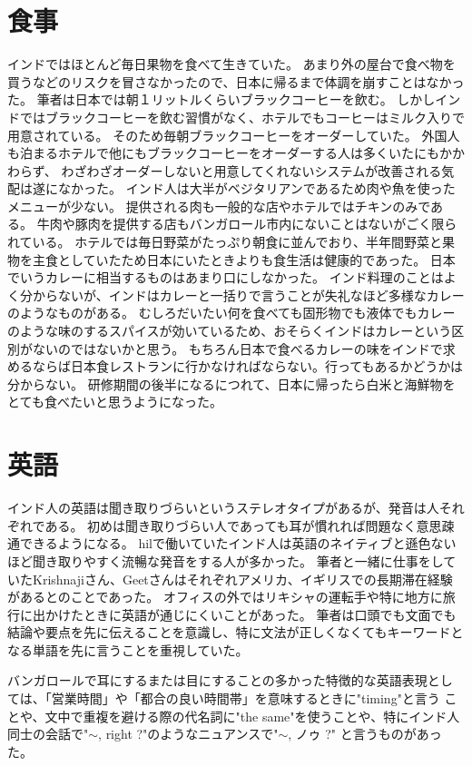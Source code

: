 \section{食事}
インドではほとんど毎日果物を食べて生きていた。
あまり外の屋台で食べ物を買うなどのリスクを冒さなかったので、日本に帰るまで体調を崩すことはなかった。
筆者は日本では朝１リットルくらいブラックコーヒーを飲む。
しかしインドではブラックコーヒーを飲む習慣がなく、ホテルでもコーヒーはミルク入りで用意されている。
そのため毎朝ブラックコーヒーをオーダーしていた。
外国人も泊まるホテルで他にもブラックコーヒーをオーダーする人は多くいたにもかかわらず、
わざわざオーダーしないと用意してくれないシステムが改善される気配は遂になかった。
インド人は大半がベジタリアンであるため肉や魚を使ったメニューが少ない。
提供される肉も一般的な店やホテルではチキンのみである。
牛肉や豚肉を提供する店もバンガロール市内にないことはないがごく限られている。
ホテルでは毎日野菜がたっぷり朝食に並んでおり、半年間野菜と果物を主食としていたため日本にいたときよりも食生活は健康的であった。
日本でいうカレーに相当するものはあまり口にしなかった。
インド料理のことはよく分からないが、インドはカレーと一括りで言うことが失礼なほど多様なカレーのようなものがある。
むしろだいたい何を食べても固形物でも液体でもカレーのような味のするスパイスが効いているため、おそらくインドはカレーという区別がないのではないかと思う。
もちろん日本で食べるカレーの味をインドで求めるならば日本食レストランに行かなければならない。行ってもあるかどうかは分からない。
研修期間の後半になるにつれて、日本に帰ったら白米と海鮮物をとても食べたいと思うようになった。
\section{英語}
インド人の英語は聞き取りづらいというステレオタイプがあるが、発音は人それぞれである。
初めは聞き取りづらい人であっても耳が慣れれば問題なく意思疎通できるようになる。
\acrshort{hil}で働いていたインド人は英語のネイティブと遜色ないほど聞き取りやすく流暢な発音をする人が多かった。
筆者と一緒に仕事をしていたKrishnajiさん、Geetさんはそれぞれアメリカ、イギリスでの長期滞在経験があるとのことであった。
オフィスの外ではリキシャの運転手や特に地方に旅行に出かけたときに英語が通じにくいことがあった。
筆者は口頭でも文面でも結論や要点を先に伝えることを意識し、特に文法が正しくなくてもキーワードとなる単語を先に言うことを重視していた。
\par
バンガロールで耳にするまたは目にすることの多かった特徴的な英語表現としては、「営業時間」や「都合の良い時間帯」を意味するときに"timing"と言う
ことや、文中で重複を避ける際の代名詞に"the same"を使うことや、特にインド人同士の会話で"$\sim$, right ?"のようなニュアンスで"$\sim$, ノゥ ?"
と言うものがあった。
